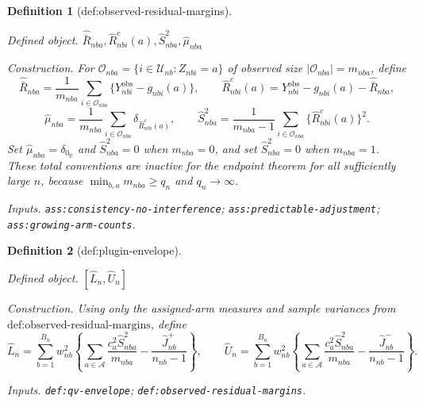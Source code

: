 \documentclass{article}
\newtheorem{definition}{Definition}
\begin{document}
\begin{definition}[def:observed-residual-margins]\label{def:observed-residual-margins}
\par\smallskip\noindent\emph{Defined object.} \(\widehat{\bar R}_{nba},\widehat R_{nbi}^{c}(a),\widehat S_{nba}^2,\widehat\mu_{nba}\)
\par\smallskip\noindent\emph{Construction.} For \(\mathcal O_{nba}=\{i\in\mathcal U_{nb}:Z_{nbi}=a\}\) of observed size \(|\mathcal O_{nba}|=m_{nba}\), define
\[
\widehat{\bar R}_{nba}=\frac1{m_{nba}}\sum_{i\in\mathcal O_{nba}}\{Y_{nbi}^{\mathrm{obs}}-g_{nbi}(a)\},\qquad \widehat R_{nbi}^{c}(a)=Y_{nbi}^{\mathrm{obs}}-g_{nbi}(a)-\widehat{\bar R}_{nba},
\]
\[
\widehat\mu_{nba}=\frac1{m_{nba}}\sum_{i\in\mathcal O_{nba}}\delta_{\widehat R_{nbi}^{c}(a)},\qquad \widehat S_{nba}^2=\frac1{m_{nba}-1}\sum_{i\in\mathcal O_{nba}}\{\widehat R_{nbi}^{c}(a)\}^2.
\]
Set \(\widehat\mu_{nba}=\delta_{0_{\mathbb R}}\) and \(\widehat S_{nba}^2=0\) when \(m_{nba}=0\), and set \(\widehat S_{nba}^2=0\) when \(m_{nba}=1\). These total conventions are inactive for the endpoint theorem for all sufficiently large \(n\), because \(\min_{b,a}m_{nba}\ge q_n\) and \(q_n\to\infty\).
\par\smallskip\noindent\emph{Inputs.} \texttt{ass:\allowbreak{}consistency-\allowbreak{}no-\allowbreak{}interference}; \texttt{ass:\allowbreak{}predictable-\allowbreak{}adjustment}; \texttt{ass:\allowbreak{}growing-\allowbreak{}arm-\allowbreak{}counts}.
\end{definition}

\begin{definition}[def:plugin-envelope]\label{def:plugin-envelope}
\par\smallskip\noindent\emph{Defined object.} \([\widehat L_n,\widehat U_n]\)
\par\smallskip\noindent\emph{Construction.} Using only the assigned-arm measures and sample variances from \(\text{def:observed-residual-margins}\), define \[\widehat L_n=\sum_{b=1}^{B_n}w_{nb}^2\left\{\sum_{a\in\mathcal A}\frac{c_a^2\widehat S_{nba}^2}{m_{nba}}-\frac{\widehat J_{nb}^{+}}{n_{nb}-1}\right\},\qquad \widehat U_n=\sum_{b=1}^{B_n}w_{nb}^2\left\{\sum_{a\in\mathcal A}\frac{c_a^2\widehat S_{nba}^2}{m_{nba}}-\frac{\widehat J_{nb}^{-}}{n_{nb}-1}\right\}.\]
\par\smallskip\noindent\emph{Inputs.} \texttt{def:\allowbreak{}qv-\allowbreak{}envelope}; \texttt{def:\allowbreak{}observed-\allowbreak{}residual-\allowbreak{}margins}.
\end{definition}
\end{document}
